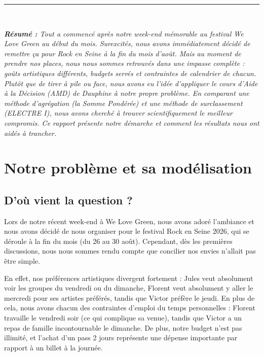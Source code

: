 \documentclass[11pt,a4paper]{article}
\begin{document}
\begin{titlepage}
    \begin{center}
        \rule{0.5\linewidth}{0.3mm}\\[0.4cm]
        \begin{minipage}{0.85\linewidth}
            \centering
            \small\itshape
            \textbf{Résumé :} Tout a commencé après notre week-end mémorable au festival We Love Green au début du mois. Surexcités, nous avons immédiatement décidé de remettre ça pour Rock en Seine à la fin du mois d'août. Mais au moment de prendre nos places, nous nous sommes retrouvés dans une impasse complète : goûts artistiques différents, budgets serrés et contraintes de calendrier de chacun. Plutôt que de tirer à pile ou face, nous avons eu l'idée d'appliquer le cours d'Aide à la Décision (AMD) de Dauphine à notre propre problème. En comparant une méthode d'agrégation (la Somme Pondérée) et une méthode de surclassement (ELECTRE I), nous avons cherché à trouver scientifiquement le meilleur compromis. Ce rapport présente notre démarche et comment les résultats nous ont aidés à trancher.
        \end{minipage}
    \end{center}
    
\end{titlepage}

\newpage
\tableofcontents
\newpage

\section{Notre problème et sa modélisation}
\label{sec:presentation}

\subsection{D'où vient la question ?}
Lors de notre récent week-end à We Love Green, nous avons adoré l'ambiance et nous avons décidé de nous organiser pour le festival Rock en Seine 2026, qui se déroule à la fin du mois (du 26 au 30 août). Cependant, dès les premières discussions, nous nous sommes rendu compte que concilier nos envies n'allait pas être simple. 

En effet, nos préférences artistiques divergent fortement : Jules veut absolument voir les groupes du vendredi ou du dimanche, Florent veut absolument y aller le mercredi pour ses artistes préférés, tandis que Victor préfère le jeudi. En plus de cela, nous avons chacun des contraintes d'emploi du temps personnelles : Florent travaille le vendredi soir (ce qui complique sa venue), tandis que Victor a un repas de famille incontournable le dimanche. De plus, notre budget n'est pas illimité, et l'achat d'un pass 2 jours représente une dépense importante par rapport à un billet à la journée.
\end{document}
